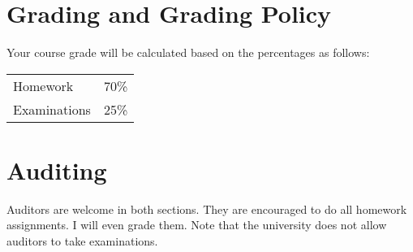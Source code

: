 \documentclass[12pt]{article}
\begin{document}
\section*{Grading and Grading Policy}

Your course grade will be calculated based on the percentages as follows: 

\begin{table}[h]
\centering
\begin{tabular}{l|l}
Homework & 70\% \\
Examinations & 25\%
\end{tabular}
\end{table}
\FloatBarrier


\section*{Auditing}

Auditors are welcome in both sections. They are encouraged to do all homework assignments. I will even grade them. Note that the university does not allow auditors to take examinations.
\end{document}
